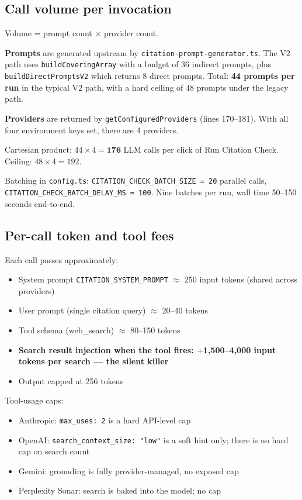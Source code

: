 \documentclass[11pt,letterpaper]{article}
\begin{document}
\subsection{Call volume per invocation}

Volume = prompt count $\times$ provider count.

\textbf{Prompts} are generated upstream by
\texttt{citation-prompt-generator.ts}. The V2 path uses
\texttt{buildCoveringArray} with a budget of 36 indirect prompts, plus
\texttt{buildDirectPromptsV2} which returns 8 direct prompts. Total:
\textbf{44 prompts per run} in the typical V2 path, with a hard ceiling of
48 prompts under the legacy path.

\textbf{Providers} are returned by \texttt{getConfiguredProviders}
(lines 170--181). With all four environment keys set, there are 4
providers.

Cartesian product: $44 \times 4 = \mathbf{176}$ LLM calls per click of Run
Citation Check. Ceiling: $48 \times 4 = 192$.

Batching in \texttt{config.ts}: \texttt{CITATION\_CHECK\_BATCH\_SIZE = 20}
parallel calls, \texttt{CITATION\_CHECK\_BATCH\_DELAY\_MS = 100}. Nine batches
per run, wall time 50--150 seconds end-to-end.

\subsection{Per-call token and tool fees}

Each call passes approximately:

\begin{itemize}[nosep]
  \item System prompt \texttt{CITATION\_SYSTEM\_PROMPT} $\approx$ 250 input tokens (shared across providers)
  \item User prompt (single citation query) $\approx$ 20--40 tokens
  \item Tool schema (web\_search) $\approx$ 80--150 tokens
  \item \textbf{Search result injection when the tool fires: $+$1,500--4,000 input tokens per search --- the silent killer}
  \item Output capped at 256 tokens
\end{itemize}

Tool-usage caps:
\begin{itemize}[nosep]
  \item Anthropic: \texttt{max\_uses: 2} is a hard API-level cap
  \item OpenAI: \texttt{search\_context\_size: "low"} is a soft hint only; there is no hard cap on search count
  \item Gemini: grounding is fully provider-managed, no exposed cap
  \item Perplexity Sonar: search is baked into the model; no cap
\end{itemize}
\end{document}
